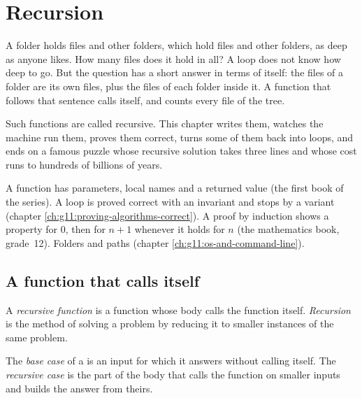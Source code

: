 \chapter{Recursion}\label{ch:g12:recursion}

A folder holds files and other folders, which hold files and other folders, as deep as anyone likes. How many files
does it hold in all? A loop does not know how deep to go. But the question has a short answer in terms of itself: the
files of a folder are its own files, plus the files of each folder inside it. A function that follows that sentence
calls itself, and counts every file of the tree.

Such functions are called recursive. This chapter writes them, watches the machine run them, proves them correct,
turns some of them back into loops, and ends on a famous puzzle whose recursive solution takes three lines and whose
cost runs to hundreds of billions of years.

\begin{recall}
A function has parameters, local names and a returned value (the first book of the series). A loop is proved correct
with an invariant and stops by a variant (chapter \ref{ch:g11:proving-algorithms-correct}). A proof by induction shows
a property for $0$, then for $n + 1$ whenever it holds for $n$ (the mathematics book, grade~12). Folders and paths
(chapter \ref{ch:g11:os-and-command-line}).
\end{recall}

\section{A function that calls itself}\label{sec:g12:recursion:calls-itself}

\begin{definition}\label{def:g12:recursion:recursion}
A \emph{recursive function} is a function whose body calls the function itself.
\emph{Recursion} is the method of solving a problem by reducing it to smaller instances of the same
problem.
\end{definition}

\begin{definition}\label{def:g12:recursion:base-case}
The \emph{base case} of a  is an input for which it answers without calling
itself. The \emph{recursive case} is the part of the body that calls the function on smaller
inputs and builds the answer from theirs.
\end{definition}

